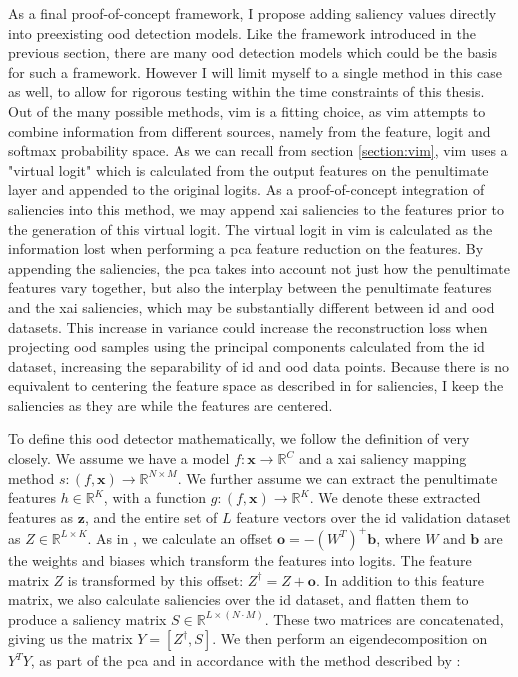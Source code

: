 \documentclass[UKenglish]{uiomasterthesis} %
\newcommand{\R}{\mathbb{R}}
\theoremstyle{definition}
\begin{document}
As a final proof-of-concept framework, I propose adding saliency values directly into preexisting \ac{ood} detection models. Like the framework introduced in the previous section, there are many \ac{ood} detection models which could be the basis for such a framework. However I will limit myself to a single method in this case as well, to allow for rigorous testing within the time constraints of this thesis. Out of the many possible methods, \ac{vim} \cite{vim} is a fitting choice, as \ac{vim} attempts to combine information from different sources, namely from the feature, logit and softmax probability space. As we can recall from section \ref{section:vim}, \ac{vim} uses a "virtual logit" which is calculated from the output features on the penultimate layer and appended to the original logits. As a proof-of-concept integration of saliencies into this method, we may append \ac{xai} saliencies to the features prior to the generation of this virtual logit. The virtual logit in \ac{vim} is calculated as the information lost when performing a \ac{pca} feature reduction on the features. By appending the saliencies, the \ac{pca} takes into account not just how the penultimate features vary together, but also the interplay between the penultimate features and the \ac{xai} saliencies, which may be substantially different between \ac{id} and \ac{ood} datasets. This increase in variance could increase the reconstruction loss when projecting \ac{ood} samples using the principal components calculated from the \ac{id} dataset, increasing the separability of \ac{id} and \ac{ood} data points. Because there is no equivalent to centering the feature space as described in \cite{vim} for saliencies, I keep the saliencies as they are while the features are centered.

To define this \ac{ood} detector mathematically, we follow the definition of \cite{vim} very closely. We assume we have a model $f: \bm{x} \to \R^C$ and a \ac{xai} saliency mapping method $s: (f, \bm{x}) \to \R^{N \times M}$. We further assume we can extract the penultimate features $h \in \R^K$, with a function $g: (f, \bm{x}) \to \R^K$. We denote these extracted features as $\bm{z}$, and the entire set of $L$ feature vectors over the \ac{id} validation dataset as $Z \in \R^{L \times K}$. As in \cite{vim}, we calculate an offset $\bm{o} = -(W^T)^+\bm{b}$, where $W$ and $\bm{b}$ are the weights and biases which transform the features into logits. The feature matrix $Z$ is transformed by this offset: $Z^\dagger = Z + \bm{o}$. In addition to this feature matrix, we also calculate saliencies over the \ac{id} dataset, and flatten them to produce a saliency matrix $S \in \R^{L \times (N \cdot M)}$. These two matrices are concatenated, giving us the matrix $Y = \left[ Z^\dagger, S \right]$. We then perform an eigendecomposition on $Y^TY$, as part of the \ac{pca} and in accordance with the method described by \cite{vim}:
\end{document}

